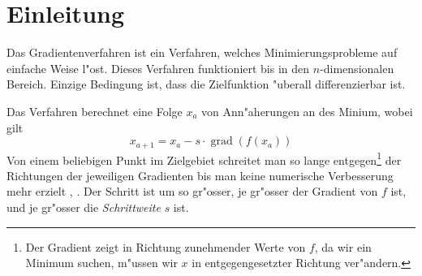 \section{Einleitung}
Das Gradientenverfahren ist ein Verfahren, welches Minimierungsprobleme
auf einfache Weise l"ost. Dieses Verfahren funktioniert bis in den
$n$-dimensionalen Bereich. Einzige Bedingung ist, dass die Zielfunktion
"uberall differenzierbar ist.

Das Verfahren berechnet eine Folge $x_a$ von Ann"aherungen
an des Minium, wobei gilt 
\begin{equation}
x_{a+1}=x_a - s \cdot \operatorname{grad}(f(x_a))
\end{equation}
Von einem beliebigen Punkt im Zielgebiet schreitet man so lange
entgegen\footnote{Der Gradient zeigt in Richtung zunehmender Werte von
$f$, da wir ein Minimum suchen, m"ussen wir $x$ in entgegengesetzter
Richtung ver"andern.}
der 
Richtungen der jeweiligen Gradienten bis man keine numerische Verbesserung
mehr erzielt \cite{descent:wiki}, \cite{descent:geigerkanzow}.
Der Schritt ist um so gr"osser, je gr"osser der Gradient von $f$ 
ist, und je gr"osser die {\it Schrittweite} $s$ ist.

